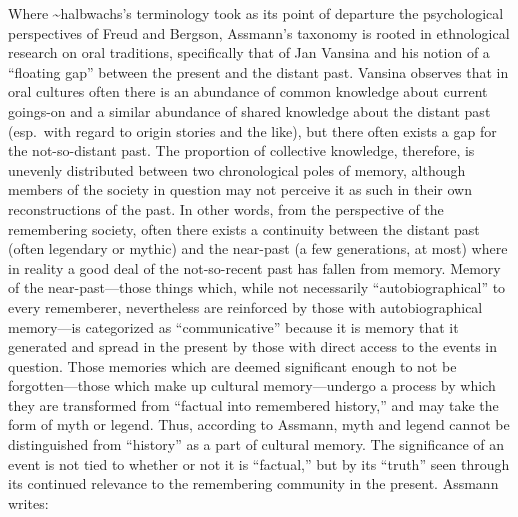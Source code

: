 Where \textasciitilde{}halbwachs's terminology took as its point of
departure the psychological perspectives of
Freud\autocite{terdiman_radstone-schwarz2011} and
Bergson\autocite{ansellpearson_radstone-schwarz2011}, Assmann's taxonomy
is rooted in ethnological research on oral traditions, specifically that
of Jan Vansina and his notion of a ``floating gap'' between the present
and the distant past.\autocite{vansina1985} Vansina observes that in
oral cultures often there is an abundance of common knowledge about
current goings-on and a similar abundance of shared knowledge about the
distant past (esp.~with regard to origin stories and the like), but
there often exists a gap for the not-so-distant past. The proportion of
collective knowledge, therefore, is unevenly distributed between two
chronological poles of memory, although members of the society in
question may not perceive it as such in their own reconstructions of the
past.\autocites[23--24]{vansina1985}[As Assmann, observes, ``In the
cultural memory of a group, both levels of the past merge seamlessly
into one another.''][35]{assmann2011} In other words, from the
perspective of the remembering society, often there exists a continuity
between the distant past (often legendary or mythic) and the near-past
(a few generations, at most) where in reality a good deal of the
not-so-recent past has fallen from memory. Memory of the
near-past---those things which, while not necessarily
``autobiographical'' to every rememberer, nevertheless are reinforced by
those with autobiographical memory---is categorized as ``communicative''
because it is memory that it generated and spread in the present by
those with direct access to the events in question. Those memories which
are deemed significant enough to not be forgotten---those which make up
cultural memory---undergo a process by which they are transformed from
``factual into remembered history,'' and may take the form of myth or
legend.\autocite[37--38]{assmann2011} Thus, according to Assmann, myth
and legend cannot be distinguished from ``history'' as a part of
cultural memory. The significance of an event is not tied to whether or
not it is ``factual,'' but by its ``truth'' seen through its continued
relevance to the remembering community in the present.\autocite[Paul
Veyne offers a particularly stimulating discussion of the perception of
the past and its relationship to myth. He concludes his book with the
insightful quote, ``The theme of this book was very simple. Merely by
reading the title, anyone with the slightest historical background would
immediately have answered, `but of course they believed in their myths!'
We have simply wanted also to make clear that what is true of `them' is
also true of ourselves and to bring out the implications of this primary
truth.''][128--129]{veyne1988} Assmann writes:

